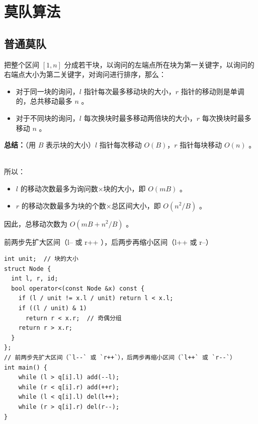 \section{莫队算法}
\subsection{普通莫队}
\par \noindent 把整个区间 $[1,n]$ 分成若干块，以询问的左端点所在块为第一关键字，以询问的右端点大小为第二关键字，对询问进行排序，那么：
\begin{itemize}
\item 对于同一块的询问，$l$ 指针每次最多移动块的大小，$r$ 指针的移动则是单调的，总共移动最多 $n$ 。
\item 对于不同块的询问，$l$ 每次换块时最多移动两倍块的大小，$r$ 每次换块时最多移动 $n$ 。
\end{itemize}

\par \noindent \textbf{总结：}（用 $B$ 表示块的大小）$l$ 指针每次移动 $O(B)$，$r$ 指针每块移动 $O(n)$ 。
~\\
\par \noindent 所以：
\begin{itemize}
\item $l$ 的移动次数最多为询问数×块的大小，即 $O(mB)$ 。
\item $r$ 的移动次数最多为块的个数×总区间大小，即 $O(n^2/B)$ 。
\end{itemize}

\par \noindent 因此，总移动次数为 $O(mB+n^2/B)$ 。
~\\
\par \noindent 前两步先扩大区间（l-- 或 r++ ），后两步再缩小区间（l++ 或 r--）
\begin{verbatim}
int unit;  // 块的大小
struct Node {
  int l, r, id;
  bool operator<(const Node &x) const {
    if (l / unit != x.l / unit) return l < x.l;
    if ((l / unit) & 1)
      return r < x.r;  // 奇偶分组
    return r > x.r;
  }
};
// 前两步先扩大区间（`l--` 或 `r++`），后两步再缩小区间（`l++` 或 `r--`）
int main() {
    while (l > q[i].l) add(--l);
    while (r < q[i].r) add(++r);
    while (l < q[i].l) del(l++);
    while (r > q[i].r) del(r--);
}
\end{verbatim}
